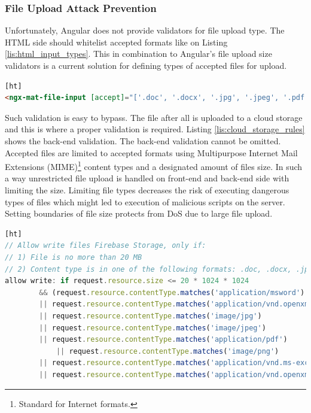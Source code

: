 \documentclass{article} %
\begin{document}
\subsubsection{File Upload Attack Prevention}
Unfortunately, Angular does not provide validators for file upload type. The HTML side should whitelist accepted formats like on Listing \ref{lis:html_input_types}. This in combination to Angular's file upload size validators is a current solution for defining types of accepted files for upload.
\begin{lstlisting}[language=HTML,firstnumber=1,label={lis:html_input_types},caption={Cloud Storage for Firebase\index{Firebase!Cloud Storage for Firebase} security rules for file upload.}][ht]
<ngx-mat-file-input [accept]="['.doc', '.docx', '.jpg', '.jpeg', '.pdf', '.png', '.xls', '.xlsx']" (change)="uploadFile($event)" formControlName="fileUploader" multiple type="file">
\end{lstlisting}
Such validation is easy to bypass. The file after all is uploaded to a cloud storage and this is where a proper validation is required. Listing \ref{lis:cloud_storage_rules} shows the back-end validation. The back-end validation cannot be omitted. Accepted files are limited to accepted formats using Multipurpose Internet Mail Extensions (MIME)\footnote{Standard for Internet formats.} content types and a designated amount of files size. In such a way unrestricted file upload is handled on front-end and back-end side with limiting the size. Limiting file types decreases the risk of executing dangerous types of files which might led to execution of malicious scripts on the server. Setting boundaries of file size protects from DoS due to large file upload.
\begin{lstlisting}[language=JavaScript,firstnumber=1,label={lis:cloud_storage_rules},caption={Cloud Storage for Firebase file upload security rules.}][ht]
// Allow write files Firebase Storage, only if:
// 1) File is no more than 20 MB
// 2) Content type is in one of the following formats: .doc, .docx, .jpg, .jpeg, .pdf, .png, .xls, .xlsx.
allow write: if request.resource.size <= 20 * 1024 * 1024
        && (request.resource.contentType.matches('application/msword')
        || request.resource.contentType.matches('application/vnd.openxmlformats-officedocument.wordprocessingml.document')
        || request.resource.contentType.matches('image/jpg')
        || request.resource.contentType.matches('image/jpeg')
        || request.resource.contentType.matches('application/pdf')
		    || request.resource.contentType.matches('image/png')
        || request.resource.contentType.matches('application/vnd.ms-excel')
        || request.resource.contentType.matches('application/vnd.openxmlformats-officedocument.spreadsheetml.sheet'))
\end{lstlisting}
\end{document}
